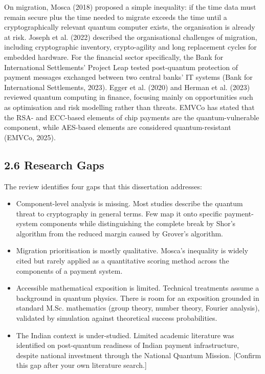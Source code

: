 \documentclass[12pt,oneside]{report}
\begin{document}
On migration, Mosca (2018) proposed a simple inequality: if the time data must remain secure plus the time needed to migrate exceeds the time until a cryptographically relevant quantum computer exists, the organisation is already at risk. Joseph et al. (2022) described the organisational challenges of migration, including cryptographic inventory, crypto-agility and long replacement cycles for embedded hardware. For the financial sector specifically, the Bank for International Settlements' Project Leap tested post-quantum protection of payment messages exchanged between two central banks' IT systems (Bank for International Settlements, 2023). Egger et al. (2020) and Herman et al. (2023) reviewed quantum computing in finance, focusing mainly on opportunities such as optimisation and risk modelling rather than threats. EMVCo has stated that the RSA- and ECC-based elements of chip payments are the quantum-vulnerable component, while AES-based elements are considered quantum-resistant (EMVCo, 2025).
\par

\subsection*{2.6 Research Gaps}

The review identifies four gaps that this dissertation addresses:
\par
\begin{itemize}
  \sloppy

    \item Component-level analysis is missing. Most studies describe the quantum threat to cryptography in general terms. Few map it onto specific payment-system components while distinguishing the complete break by Shor's algorithm from the reduced margin caused by Grover's algorithm.
\par

    \item Migration prioritisation is mostly qualitative. Mosca's inequality is widely cited but rarely applied as a quantitative scoring method across the components of a payment system.
\par

    \item Accessible mathematical exposition is limited. Technical treatments assume a background in quantum physics. There is room for an exposition grounded in standard M.Sc. mathematics (group theory, number theory, Fourier analysis), validated by simulation against theoretical success probabilities.
\par

    \item The Indian context is under-studied. Limited academic literature was identified on post-quantum readiness of Indian payment infrastructure, despite national investment through the National Quantum Mission. [Confirm this gap after your own literature search.]
    \end{itemize}
\par
\end{document}
